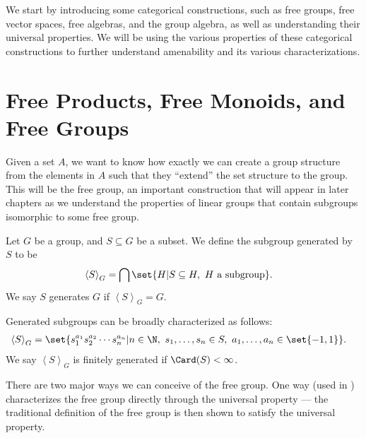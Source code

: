 We start by introducing some categorical constructions, such as free groups, free vector spaces, free algebras, and the group algebra, as well as understanding their universal properties. We will be using the various properties of these categorical constructions to further understand amenability and its various characterizations.
\section{Free Products, Free Monoids, and Free Groups}%
Given a set $A$, we want to know how exactly we can create a group structure from the elements in $A$ such that they ``extend'' the set structure to the group. This will be the free group, an important construction that will appear in later chapters as we understand the properties of linear groups that contain subgroups isomorphic to some free group. 
\begin{definition}
  Let $G$ be a group, and $S\subseteq G$ be a subset. We define the subgroup {generated by} $S$ to be
  \begin{align*}
    \left\langle S \right\rangle_{G} &= \bigcap \set{H | S\subseteq H,~H\text{ a subgroup}}.
  \end{align*}
  We say $S$ generates $G$ if $\left\langle S \right\rangle_{G} = G$.\newline

  Generated subgroups can be broadly characterized as follows:
  \begin{align*}
    \left\langle S \right\rangle_{G} &= \set{s_1^{a_1}s_2^{a_2}\cdots s_n^{a_n} | n\in\N,~s_1,\dots,s_n\in S,~a_1,\dots,a_n\in \set{-1,1}}.
  \end{align*}
  We say $\left\langle S \right\rangle_{G}$ is finitely generated if $\Card(S) < \infty$.
\end{definition}
There are two major ways we can conceive of the free group. One way (used in \cite{loh_geometric_group_theory}) characterizes the free group directly through the universal property --- the traditional definition of the free group is then shown to satisfy the universal property.\newline

